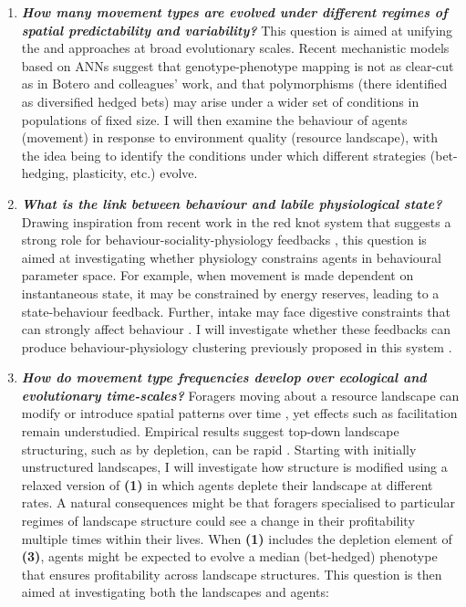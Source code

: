 \begin{enumerate}
\def\labelenumi{\arabic{enumi}.}
\item
  \textbf{\emph{How many movement types are evolved under different regimes of spatial predictability and variability?}} This question is aimed at unifying the \citet{wolf2010} and \citet{botero2015} approaches at broad evolutionary scales. Recent mechanistic models based on ANNs suggest that genotype-phenotype mapping is not as clear-cut as in Botero and colleagues' work, and that polymorphisms (there identified as diversified hedged bets) may arise under a wider set of conditions in populations of fixed size. I will then examine the behaviour of agents (movement) in response to environment quality (resource landscape), with the idea being to identify the conditions under which different strategies (bet-hedging, plasticity, etc.) evolve.
\item
  \textbf{\emph{What is the link between behaviour and labile physiological state?}} Drawing inspiration from recent work in the red knot system that suggests a strong role for behaviour-sociality-physiology feedbacks \citetext{\citealp{bijleveld2014}; \citealp{mathot2017}; \citealp{oudman2016}; \citealp[discussed in][]{wolf2010}}, this question is aimed at investigating whether physiology constrains agents in behavioural parameter space. For example, when movement is made dependent on instantaneous state, it may be constrained by energy reserves, leading to a state-behaviour feedback. Further, intake may face digestive constraints that can strongly affect behaviour \citep{vangils2004}. I will investigate whether these feedbacks can produce behaviour-physiology clustering previously proposed in this system \citep{bijleveld2015b}.
\item
  \textbf{\emph{How do movement type frequencies develop over ecological and evolutionary time-scales?}} Foragers moving about a resource landscape can modify or introduce spatial patterns over time \citep{dejager2011, getz2015, netz2017}, yet effects such as facilitation remain understudied. Empirical results suggest top-down landscape structuring, such as by depletion, can be rapid \citep{bijleveld2015c}. Starting with initially unstructured landscapes, I will investigate how structure is modified using a relaxed version of \textbf{(1)} in which agents deplete their landscape at different rates. A natural consequences might be that foragers specialised to particular regimes of landscape structure could see a change in their profitability multiple times within their lives. When \textbf{(1)} includes the depletion element of \textbf{(3)}, agents might be expected to evolve a median (bet-hedged) phenotype that ensures profitability across landscape structures. This question is then aimed at investigating both the landscapes and agents:


\end{enumerate}
